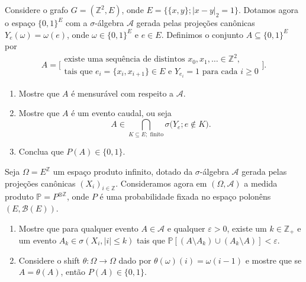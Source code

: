 \begin{exercise}
  Considere o grafo $G = (\mathbb{Z}^2, E)$, onde $E = \big\{ \{x,y\}; |x - y|_2 = 1 \big\}$.
  Dotamos agora o espaço $\{0,1\}^E$ com a $\sigma$-álgebra $\mathcal{A}$ gerada pelas projeções canônicas $Y_e(\omega) = \omega(e)$, onde $\omega \in \{0,1\}^E$ e $e \in E$.
  Definimos o conjunto $A \subseteq \{0,1\}^E$ por
  \begin{equation}
    A = \Big[
    \begin{array}{c}
      \text{existe uma sequência de distintos $x_0, x_1, \dots \in \mathbb{Z}^2$,}\\
      \text{tais que $e_i = \{x_i, x_{i+1}\} \in E$ e $Y_{e_i} = 1$ para cada $i \geq 0$}
    \end{array}
    \Big].
  \end{equation}
  \begin{enumerate}[\quad a)]
  \item Mostre que $A$ é mensurável com respeito a $\mathcal{A}$.
  \item Mostre que $A$ é um evento caudal, ou seja
    \begin{equation}
      A \in \bigcap_{K \subseteq E; \text{ finito}} \sigma\big( Y_e; e \not \in K \big).
    \end{equation}
  \item Conclua que $P(A) \in \{0,1\}$.
  \end{enumerate}
\end{exercise}

\begin{exercise}
  Seja $\Omega = E^\mathbb{Z}$ um espaço produto infinito, dotado da $\sigma$-álgebra $\mathcal{A}$ gerada pelas projeções canônicas $(X_i)_{i \in \mathbb{Z}}$.
  Consideramos agora em $(\Omega, \mathcal{A})$ a medida produto $\mathbb{P} = P^{\otimes \mathbb{Z}}$, onde $P$ é uma probabilidade fixada no espaço polonêns $(E, \mathcal{B}(E))$.
  \begin{enumerate}[\quad a)]
  \item Mostre que para qualquer evento $A \in \mathcal{A}$ e qualquer $\varepsilon > 0$, existe um $k \in \mathbb{Z}_+$ e um evento $A_k \in \sigma(X_i, |i| \leq k)$ tais que $\mathbb{P}[(A \setminus A_k) \cup (A_k \setminus A)] < \varepsilon$.
  \item Considere o shift $\theta:\Omega \to \Omega$ dado por $\theta(\omega)(i) = \omega(i-1)$ e mostre que se $A = \theta(A)$, então $P(A) \in \{0,1\}$.
  \end{enumerate}
\end{exercise}

